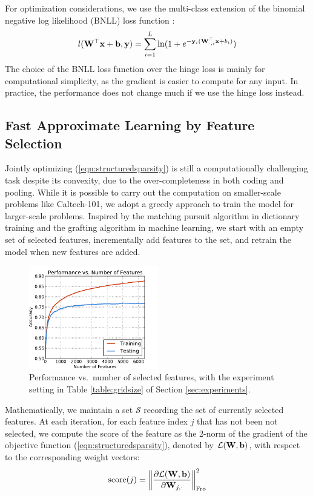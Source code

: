 For optimization considerations, we use the multi-class extension of the binomial negative log likelihood (BNLL) loss function \cite{Perkins:2003vc}:
\begin{equation}
  l(\mathbf{W}^\top\mathbf{x} + \mathbf{b}, \mathbf{y}) = \sum_{i=1}^{L}\ln(1+e^{-\mathbf{y}_i(\mathbf{W}_{\cdot,i}^\top \mathbf{x} + b_i)})
\end{equation}
The choice of the BNLL loss function over the hinge loss is mainly for computational simplicity, as the gradient is easier to compute for any input. In practice, the performance does not change much if we use the hinge loss instead.

\subsection{Fast Approximate Learning by Feature Selection}
Jointly optimizing (\ref{eqn:structuredsparsity}) is still a computationally challenging task despite its convexity, due to the over-completeness in both coding and pooling. While it is possible to carry out the computation on smaller-scale problems like Caltech-101, we adopt a greedy approach to train the model for larger-scale problems. Inspired by the matching pursuit algorithm in dictionary training and the grafting algorithm \cite{Perkins:2003vc} in machine learning, we start with an empty set of selected features, incrementally add features to the set, and retrain the model when new features are added. 

\begin{figure}
  \centering
  \includegraphics[width=0.5\textwidth]{figs/smartpooling/grafting_perf.pdf}
  \caption{Performance vs.\ number of selected features, with the experiment setting in Table \ref{table:gridsize} of Section \ref{sec:experiments}.}\label{fig:graftingsteps}
\end{figure}

Mathematically, we maintain a set $\mathcal{S}$ recording the set of currently selected features. At each iteration, for each feature index $j$ that has not been not selected, we compute the score of the feature as the 2-norm of the gradient of the objective function (\ref{eqn:structuredsparsity}), denoted by $\mathcal{L}(\mathbf{W},\mathbf{b})$, with respect to the corresponding weight vectors:
\begin{eqnarray}
  \operatorname{score}(j) = \left\|\frac{\partial \mathcal{L}(\mathbf{W},\mathbf{b})}{\partial \mathbf{W}_{j,\cdot}}\right\|_\mathrm{Fro}^2
\end{eqnarray}

